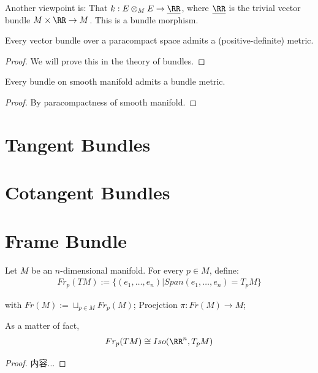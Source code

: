 \documentclass[Total.tex]{subfiles}
\begin{document}
				Another viewpoint is: That $k:E\otimes_M E\rightarrow \underline{\RR}$, where $\underline{\RR}$ is the trivial vector bundle $M\times \RR\rightarrow M$. This is a bundle morphism.
			
				\begin{lemma}
					Every vector bundle over a paracompact space admits a (positive-definite) metric. 
				\end{lemma}
				\begin{proof}
					We will prove this in the theory of bundles.  
				\end{proof}
				
				\begin{corollary}
					Every bundle on smooth manifold admits a bundle metric. 
				\end{corollary}
				\begin{proof}
					By paracompactness of smooth manifold. 
				\end{proof}
		\section{Tangent Bundles}
		\section{Cotangent Bundles}
		
		
	
		\section{Frame Bundle}
			\begin{Def}
				Let $M$ be an $n$-dimensional manifold. For every $p\in M$, define:
				\begin{gather*}
					Fr_p(TM):=\{(e_1,\dots,e_n)|Span(e_1,\dots,e_n)=T_p M\}
				\end{gather*}
				
				with $Fr(M):=\sqcup_{p\in M} Fr_p (M)$; Proejction $\pi:Fr(M)\rightarrow M$;
			\end{Def}
			
			\begin{lemma}
				As a matter of fact,
				\begin{gather*}
					Fr_p(TM)\cong Iso(\RR^n,T_p M)
				\end{gather*}
			\end{lemma}
			\begin{proof}
				内容...
			\end{proof}
			
\end{document}
